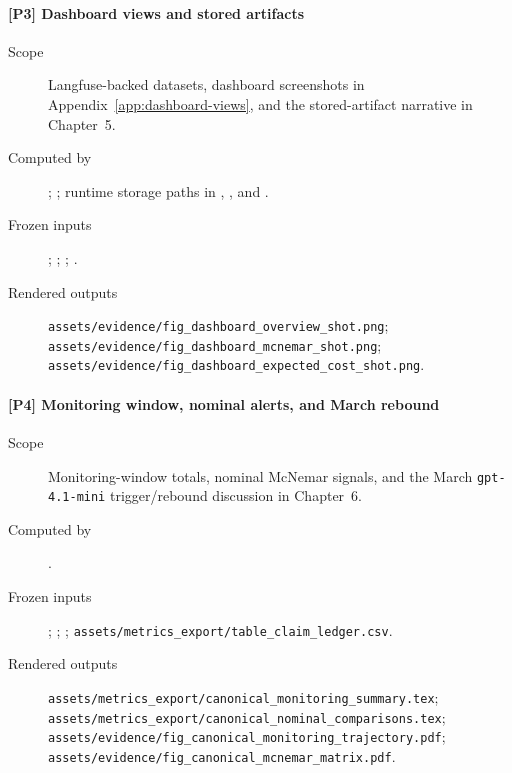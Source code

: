 \label{prov:P3}
\paragraph*{[P3] Dashboard views and stored artifacts}
\begin{description}
    \item[Scope] Langfuse-backed datasets, dashboard screenshots in Appendix~\ref{app:dashboard-views}, and the stored-artifact narrative in Chapter~5.
    \item[Computed by] ; ; runtime storage paths in , , and .
    \item[Frozen inputs] ; ; ; .
    \item[Rendered outputs] \texttt{assets/evidence/fig\_dashboard\_overview\_shot.png}; \texttt{assets/evidence/fig\_dashboard\_mcnemar\_shot.png}; \texttt{assets/evidence/fig\_dashboard\_expected\_cost\_shot.png}.
\end{description}

\label{prov:P4}
\paragraph*{[P4] Monitoring window, nominal alerts, and March rebound}
\begin{description}
    \item[Scope] Monitoring-window totals, nominal McNemar signals, and the March \texttt{gpt-4.1-mini} trigger/rebound discussion in Chapter~6.
    \item[Computed by] .
    \item[Frozen inputs] ; ; ; \texttt{assets/metrics\_export/table\_claim\_ledger.csv}.
    \item[Rendered outputs] \texttt{assets/metrics\_export/canonical\_monitoring\_summary.tex}; \texttt{assets/metrics\_export/canonical\_nominal\_comparisons.tex}; \texttt{assets/evidence/fig\_canonical\_monitoring\_trajectory.pdf}; \texttt{assets/evidence/fig\_canonical\_mcnemar\_matrix.pdf}.
\end{description}


